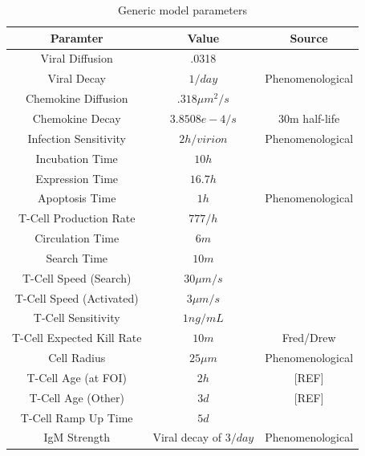 \documentclass[10pt]{article}
\begin{document}
\begin{table}
\begin{tabular}{ | c | c | c | }
  \hline                        
  Paramter & Value & Source \\
  \hline
  Viral Diffusion & .0318 & \cite{Beauchemin2006} \\
  Viral Decay &  $1/day$ & Phenomenological \\
  Chemokine Diffusion & $.318 \mu m^2/s$ & \cite{Beauchemin2006} \\
  Chemokine Decay &  $3.8508e-4/s$ & 30m half-life \\
  Infection Sensitivity &  $2 h/virion$ & Phenomenological \\
  Incubation Time &  $10 h$ & \cite{Mitchell2011} \\
  Expression Time &  $16.7 h$ & \cite{Mitchell2011} \\
  Apoptosis Time & $1 h$ & Phenomenological \\
  T-Cell Production Rate & $777/h$ & \cite{Miao2010} \\ 
  Circulation Time & $6 m$ & \cite{Banerjee2010b} \\
  Search Time & $10 m$ & \cite{Banerjee2010b} \\
  T-Cell Speed (Search) & $30 \mu m/s$ & \cite{Miller2003} \\
  T-Cell Speed (Activated) & $3 \mu m/s$ & \cite{Miller2003} \\
  T-Cell Sensitivity & $1 ng/mL$ & \cite{Gao2003} \\
  T-Cell Expected Kill Rate & $10 m$ & Fred/Drew \\
  Cell Radius & $25 \mu m$ & Phenomenological \\
  T-Cell Age (at FOI) & $2 h$ & [REF] \\
  T-Cell Age (Other) & $3 d$ & [REF] \\
  T-Cell Ramp Up Time & $5 d$ & \cite{Banerjee2011} \\
  IgM Strength & Viral decay of $3/day$ & Phenomenological \\
  \hline  
\end{tabular}
\caption{Generic model parameters}
\label{table:parameters}
\end{table}
\end{document}
